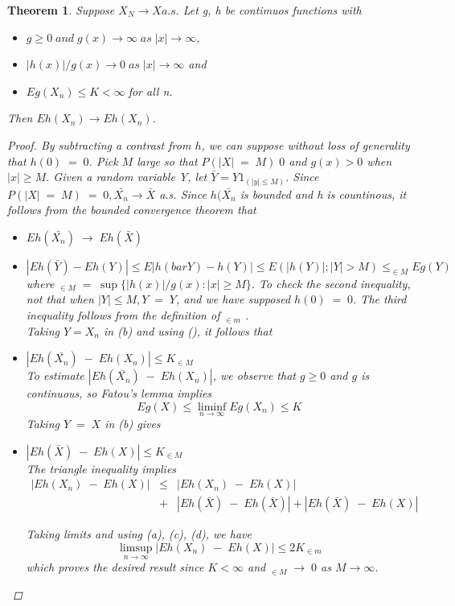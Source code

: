 \documentclass[10pt]{article}
\newtheorem{theorem}{Theorem}
\begin{document}
\begin{theorem}  \label{Definition}
Suppose $X_{N} \rightarrow X a.s.$ Let g, h be contimuos functions with
\begin{itemize}
\item[(i)] $g \geq 0 \; and \; g(x) \rightarrow \infty \; as\; |x|\rightarrow \infty$,
\item[(ii)] $|h(x)|/g(x) \rightarrow 0 \; as\; |x|\rightarrow \infty$
and \item[(iii)] $Eg(X_{n})\leq K < \infty \; $for all n.

\end{itemize}
Then $Eh(X_{n})\rightarrow Eh(X_{n})$.

\begin{proof}
By subtracting a contrast from $h$, we can suppose without loss of generality that $h(0)\;=\;0$. Pick $M$ large so that $P(|X|\;=\;M)\;0$ and $g(x)>0$ when $|x|\geq M$. Given a random variable Y, let $\bar{Y}=Y1_{(|y|\leq M)}$. Since $P(|X|\;=\;M)\;=\;0, \bar{X_{n}} \rightarrow \bar{X}$ a.s. Since $h(\bar{X_{n}}$ is bounded and h is countinous, it follows from the bounded convergence theorem that 

\begin{itemize}
\item[(a)]
$  Eh(\bar{X_{n}})\;\rightarrow\;Eh(\bar{X}) $
\item[(b)]
$ |Eh(\bar{Y})-Eh(Y)|\leq E|h(bar{Y})-h(Y)|\leq E(|h(Y)|;|Y|>M)\leq _{\in M}Eg(Y)$
where $_{\in M} \;=\;\sup\{|h(x)|/g(x) : |x| \geq M\}$.
To check the second inequality, not that when $|Y|\leq M, Y\;=\;Y$, and we have supposed $h(0)\;=\;0$. The third inequality follows from the definition of $_{\in m}$ .
\\
Taking $Y=X_{n}$ in (b) and using ({}), it follows that
\item[(c)] 
$|Eh(\bar{X_{n}})\;-\;Eh(X_{n})|\leq K_{\in M} $
\\
To estimate $|Eh(\bar{X_{n}})\;-\;Eh(X_{n})|$, we observe that $g\geq 0$ and $g$ is continuous, so Fatou's lemma implies
$$
Eg(X) \leq \liminf_{n \rightarrow \infty} Eg(X_{n}) \leq K
$$
Taking $Y\; = \;X$ in (b) gives
\item[(d)] 
$|Eh(\bar{X})\;-\;Eh(X)|\leq K_{\in M} $ \\
The triangle inequality implies 
\begin{eqnarray*}
|Eh(X_{n})\;-\;Eh(X)|  & \leq &  |Eh(X_{n})\;-\;Eh(X)|\\
&+&|Eh(\bar{X})\;-\;Eh(\bar{X})| + |Eh(\bar{X})\;-\;Eh(X)|
\end{eqnarray*}

Taking limits and using (a), (c), (d), we have
$$
\limsup_{n \rightarrow \infty} |Eh(X_{n}) \;-\; Eh(X)| \leq 2 K_{\in m}
$$
which proves the desired result since $K<\infty$ and 
$_{\in M} \;\rightarrow \; 0$ as $M \rightarrow \infty$.



\end{itemize}




\end{proof}

\end{theorem}
\end{document}
